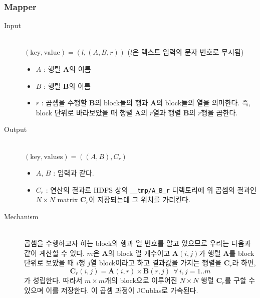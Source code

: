 \documentclass[a4paper]{article}
\begin{document}
\begin{multicols}{2}
\subsubsection{Mapper}
\begin{description}
	\item[Input] \hfill \\
	$(\text{key}, \text{value})  = (l, (A, B, r))$ ($l$은 텍스트 입력의 문자 번호로 무시됨)
	\begin{itemize}
		\item $A$ : 행렬 $\mathbf{A}$의 이름
		\item $B$ : 행렬 $\mathbf{B}$의 이름
		\item $r$ : 곱셈을 수행할 $\mathbf{B}$의 block들의 행과 $\mathbf{A}$의 block들의 열을 의미한다. 즉, block 단위로 바라보았을 때 행렬 $\mathbf{A}$의 $r$열과 행렬 $\mathbf{B}$의 $r$행을 곱한다.
	\end{itemize}
	\item[Output] \hfill \\
	$(\text{key}, \text{values}) = ((A, B), C_r)$
	\begin{itemize}
		\item $A$, $B$ : 입력과 같다.
		\item $C_r$ : 연산의 결과로 HDFS 상의 \texttt{\_\_tmp/A\_B\_r} 디렉토리에 위 곱셈의 결과인 $N \times N$ matrix $\mathbf{C}_r$이 저장되는데 그 위치를 가리킨다.
	\end{itemize}
	\item[Mechanism] \hfill \\
	곱셈을 수행하고자 하는 block의 행과 열 번호를 알고 있으므로 우리는 다음과 같이 계산할 수 있다. $m$은 $\mathbf{A}$의 block 열 개수이고 $\mathbf{A}(i,j)$가 행렬 $\mathbf{A}$를 block 단위로 보았을 때 $i$행 $j$열 block이라고 하고 결과값을 가지는 행렬을 $\mathbf{C}_r$라 하면,
	\begin{equation*}
		\mathbf{C}_r(i,j) = \mathbf{A}(i,r) \times \mathbf{B}(r,j) \:\:\forall \,i,j=1..m
	\end{equation*}
	가 성립한다. 따라서 $m \times m$개의 block으로 이루어진 $N \times N$ 행렬 $\mathbf{C}_r$를 구할 수 있으며 이를 저장한다.
	이 곱셈 과정이 JCublas로 가속된다.
\end{description}

\end{multicols}
\end{document}
